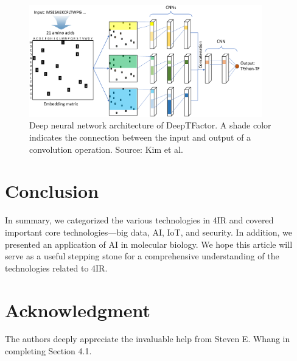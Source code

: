 \documentclass[11pt]{article}
\begin{document}
\begin{figure}[h]
  \centering
  \includegraphics[width=0.9\textwidth]{DeepTFactor.pdf}
  \caption{Deep neural network architecture of DeepTFactor. A shade color indicates the connection between the input and output of a convolution operation. Source: Kim et al.\,\cite{DeepTFactor}}
  \label{fig:DeepTFactor}
\end{figure}


\section{Conclusion}
In summary, we categorized the various technologies in 4IR and covered important core technologies---big data, AI, IoT, and security. In addition, we presented an application of AI in molecular biology. We hope this article will serve as a useful stepping stone for a comprehensive understanding of the technologies related to 4IR.

\section*{Acknowledgment}
The authors deeply appreciate the invaluable help from Steven E. Whang in completing Section 4.1.


\small
\itemsep=1pt
%
\end{document}

